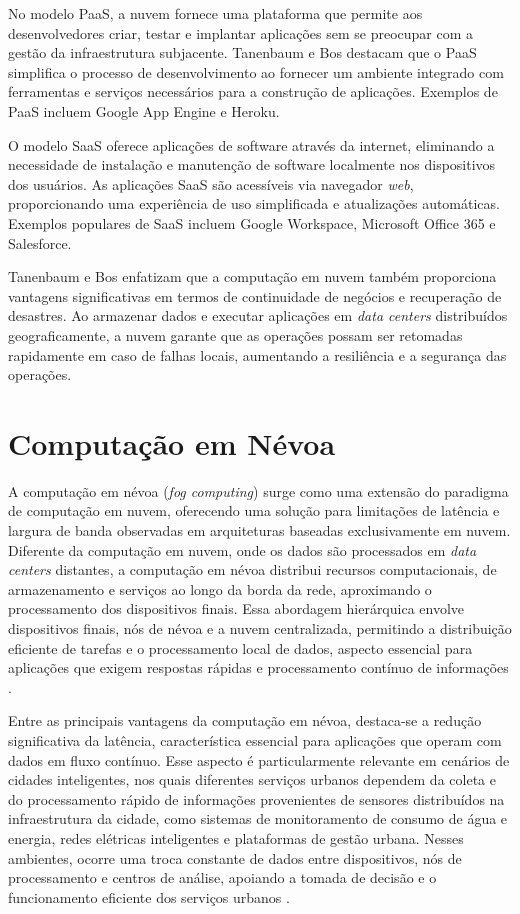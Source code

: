 No modelo \gls{PaaS}, a nuvem fornece uma plataforma que permite aos desenvolvedores criar, testar e implantar aplicações sem se preocupar com a gestão da infraestrutura subjacente. Tanenbaum e Bos destacam que o \gls{PaaS} simplifica o processo de desenvolvimento ao fornecer um ambiente integrado com ferramentas e serviços necessários para a construção de aplicações. Exemplos de \gls{PaaS} incluem Google App Engine e Heroku.

O modelo \gls{SaaS} oferece aplicações de software através da internet, eliminando a necessidade de instalação e manutenção de software localmente nos dispositivos dos usuários. As aplicações SaaS são acessíveis via navegador \textit{web}, proporcionando uma experiência de uso simplificada e atualizações automáticas. Exemplos populares de SaaS incluem Google Workspace, Microsoft Office 365 e Salesforce.

Tanenbaum e Bos enfatizam que a computação em nuvem também proporciona vantagens significativas em termos de continuidade de negócios e recuperação de desastres. Ao armazenar dados e executar aplicações em \textit{data centers} distribuídos geograficamente, a nuvem garante que as operações possam ser retomadas rapidamente em caso de falhas locais, aumentando a resiliência e a segurança das operações.

\section{Computação em Névoa}

A computação em névoa (\textit{fog computing}) surge como uma extensão do paradigma de computação em nuvem, oferecendo uma solução para limitações de latência e largura de banda observadas em arquiteturas baseadas exclusivamente em nuvem. Diferente da computação em nuvem, onde os dados são processados em \textit{data centers} distantes, a computação em névoa distribui recursos computacionais, de armazenamento e serviços ao longo da borda da rede, aproximando o processamento dos dispositivos finais. Essa abordagem hierárquica envolve dispositivos finais, nós de névoa e a nuvem centralizada, permitindo a distribuição eficiente de tarefas e o processamento local de dados, aspecto essencial para aplicações que exigem respostas rápidas e processamento contínuo de informações \cite{rahmani2018}.

Entre as principais vantagens da computação em névoa, destaca-se a redução significativa da latência, característica essencial para aplicações que operam com dados em fluxo contínuo. Esse aspecto é particularmente relevante em cenários de cidades inteligentes, nos quais diferentes serviços urbanos dependem da coleta e do processamento rápido de informações provenientes de sensores distribuídos na infraestrutura da cidade, como sistemas de monitoramento de consumo de água e energia, redes elétricas inteligentes e plataformas de gestão urbana. Nesses ambientes, ocorre uma troca constante de dados entre dispositivos, nós de processamento e centros de análise, apoiando a tomada de decisão e o funcionamento eficiente dos serviços urbanos \cite{khan2021,tseng2018}.


